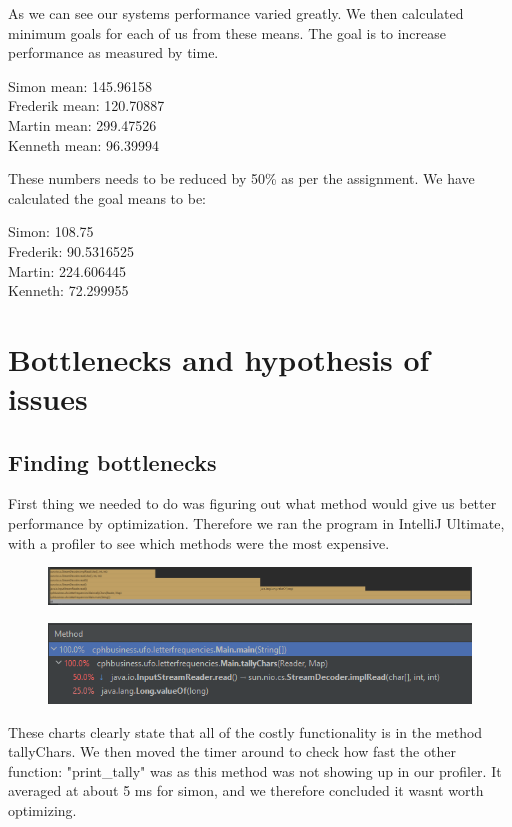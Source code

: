 \documentclass[parskip=full]{scrartcl}
\begin{document}
As we can see our systems performance varied greatly. We then calculated minimum goals for each of us from these means.
The goal is to increase performance as measured by time.

Simon mean: 145.96158\\
Frederik mean: 120.70887\\
Martin mean: 299.47526\\
Kenneth mean: 96.39994

These numbers needs to be reduced by 50\% as per the assignment.
We have calculated the goal means to be:

Simon: 108.75\\
Frederik: 90.5316525\\
Martin: 224.606445\\
Kenneth: 72.299955
\clearpage

\section{Bottlenecks and hypothesis of issues}
\subsection{Finding bottlenecks}
First thing we needed to do was figuring out what method would give us better performance by optimization.
Therefore we ran the program in IntelliJ Ultimate, with a profiler to see which methods were the most expensive.

\begin{figure}[!h]
    \centering
    \includegraphics[width=\textwidth]{unchanged_code_flame_graph.png}
\end{figure}

\begin{figure}[!h]
    \centering
    \includegraphics[width=\textwidth]{unchanged_code_call_tree.png}
\end{figure}

These charts clearly state that all of the costly functionality is in the method tallyChars. 
We then moved the timer around to check how fast the other function: "print\_tally" was as this method was not showing up in our profiler. 
It averaged at about 5 ms for simon, and we therefore concluded it wasnt worth optimizing.
\clearpage
\end{document}
